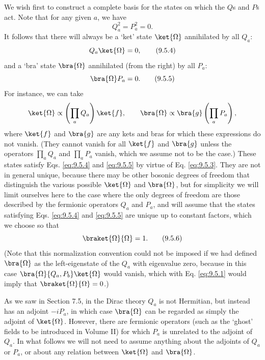 We wish first to construct a complete basis for the states on which the $Q$s
and $P$s act. Note that for any given $a$, we have
\begin{equation}
Q_a^2=P_a^2=0.
\tag{9.5.3}\label{eq:9.5.3}
\end{equation}
It follows that there will always be a `ket' state $\ket{\Omega}$ annihilated
by all $Q_a$:
\begin{equation}
Q_a\ket{\Omega}=0,
\tag{9.5.4}\label{eq:9.5.4}
\end{equation}
and a `bra' state $\bra{\Omega}$ annihilated (from the right) by all $P_a$:
\begin{equation}
\bra{\Omega}P_a=0.
\tag{9.5.5}\label{eq:9.5.5}
\end{equation}
For instance, we can take
\[
\ket{\Omega}\propto\left(\prod_a Q_a\right)\ket{f},
\qquad
\bra{\Omega}\propto\bra{g}\left(\prod_a P_a\right),
\]
where $\ket{f}$ and $\bra{g}$ are any kets and bras for which these expressions
do not vanish. (They cannot vanish for all $\ket{f}$ and $\bra{g}$ unless the
operators $\prod_aQ_a$ and $\prod_aP_a$ vanish, which we assume not to be the
case.) These states satisfy Eqs. \eqref{eq:9.5.4} and \eqref{eq:9.5.5} by virtue of Eq. \eqref{eq:9.5.3}.
They are not in general unique, because there may be other bosonic degrees of
freedom that distinguish the various possible $\ket{\Omega}$ and
$\bra{\Omega}$, but for simplicity we will limit ourselves here to the case
where the only degrees of freedom are those described by the fermionic
operators $Q_a$ and $P_a$, and will assume that the states satisfying Eqs.
\eqref{eq:9.5.4} and \eqref{eq:9.5.5} are unique up to constant factors, which we choose so that
\begin{equation}
\braket{\Omega}{\Omega}=1.
\tag{9.5.6}\label{eq:9.5.6}
\end{equation}
(Note that this normalization convention could not be imposed if we had
defined $\bra{\Omega}$ as the left-eigenstate of the $Q_a$ with eigenvalue
zero, because in this case $\bra{\Omega}\{Q_a,P_b\}\ket{\Omega}$ would vanish,
which with Eq. \eqref{eq:9.5.1} would imply that $\braket{\Omega}{\Omega}=0$.)

As we saw in Section 7.5, in the Dirac theory $Q_a$ is not Hermitian, but
instead has an adjoint $-iP_a$, in which case $\bra{\Omega}$ can be regarded as
simply the adjoint of $\ket{\Omega}$. However, there are fermionic operators
(such as the `ghost' fields to be introduced in Volume II) for which $P_a$ is
unrelated to the adjoint of $Q_a$. In what follows we will not need to assume
anything about the adjoints of $Q_a$ or $P_a$, or about any relation between
$\ket{\Omega}$ and $\bra{\Omega}$.

